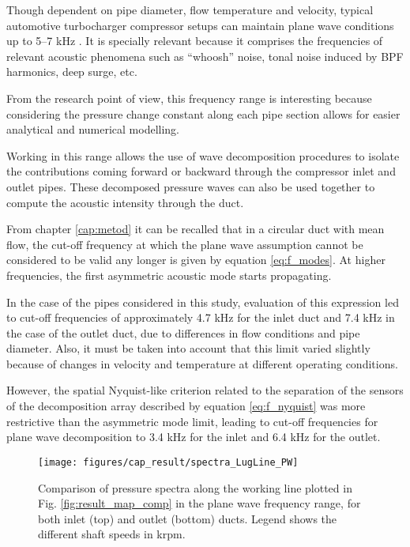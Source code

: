 Though dependent on pipe diameter, flow temperature and velocity, typical automotive turbocharger compressor setups can maintain plane wave conditions up to 5--7 kHz \cite{gaude2008experimental}. It is specially relevant because it comprises the frequencies of relevant acoustic phenomena such as ``whoosh'' noise, tonal noise induced by BPF harmonics, deep surge, etc.

From the research point of view, this frequency range is interesting because considering the pressure change constant along each pipe section allows for easier analytical and numerical modelling. 

Working in this range allows the use of wave decomposition procedures to isolate the contributions coming forward or backward through the compressor inlet and outlet pipes. These decomposed pressure waves can also be used together to compute the acoustic intensity through the duct.

From chapter \ref{cap:metod} it can be recalled that in a circular duct with mean flow, the cut-off frequency at which the plane wave assumption cannot be considered to be valid any longer is given by equation \ref{eq:f_modes}. At higher frequencies, the first asymmetric acoustic mode starts propagating.

In the case of the pipes considered in this study, evaluation of this expression led to cut-off frequencies of approximately 4.7 kHz for the inlet duct and 7.4 kHz in the case of the outlet duct, due to differences in flow conditions and pipe diameter. Also, it must be taken into account that this limit varied slightly because of changes in velocity and temperature at different operating conditions.

However, the spatial Nyquist-like criterion related to the separation of the sensors of the decomposition array described by equation \ref{eq:f_nyquist} was more restrictive than the asymmetric mode limit, leading to cut-off frequencies for plane wave decomposition to 3.4 kHz for the inlet and 6.4 kHz for the outlet.

\begin{figure}[tbh!]
\centering
\texttt{[image: figures/cap\_result/spectra\_LugLine\_PW]}
\caption{Comparison of pressure spectra along the working line plotted in Fig. \ref{fig:result_map_comp} in the plane wave frequency range, for both inlet (top) and outlet (bottom) ducts. Legend shows the different shaft speeds in krpm.}
\label{fig:result_spectra_LugLine_PW}
\end{figure}

